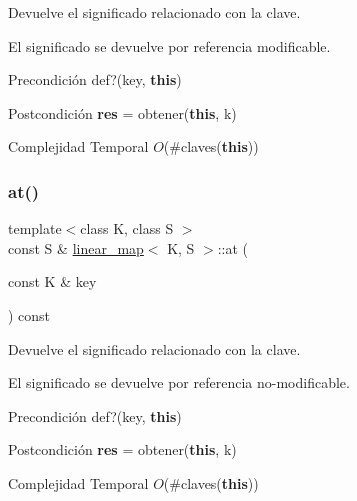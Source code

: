 Devuelve el significado relacionado con la clave. 

El significado se devuelve por referencia modificable.

\begin{DoxyPrecond}{Precondición}
def?(key, {\bfseries this}) 
\end{DoxyPrecond}
\begin{DoxyPostcond}{Postcondición}
{\bfseries res} = obtener({\bfseries this}, k)
\end{DoxyPostcond}

\begin{DoxyDescription}
\item[Complejidad Temporal]$O$(\#claves({\bfseries this}))
\end{DoxyDescription}\mbox{\label{classlinear__map_a373f306f920941123cb47f6b77ed97ed}} 
\subsubsection{\texorpdfstring{at()}{at()}\hspace{0.1cm}{\footnotesize\ttfamily [2/2]}}
{\footnotesize\ttfamily template$<$class K, class S $>$ \\
const S \& \mbox{\hyperlink{classlinear__map}{linear\+\_\+map}}$<$ K, S $>$\+::at (\begin{DoxyParamCaption}\item[{const K \&}]{key }\end{DoxyParamCaption}) const}



Devuelve el significado relacionado con la clave. 

El significado se devuelve por referencia no-\/modificable.

\begin{DoxyPrecond}{Precondición}
def?(key, {\bfseries this}) 
\end{DoxyPrecond}
\begin{DoxyPostcond}{Postcondición}
{\bfseries res} = obtener({\bfseries this}, k)
\end{DoxyPostcond}

\begin{DoxyDescription}
\item[Complejidad Temporal]$O$(\#claves({\bfseries this}))
\end{DoxyDescription}\mbox{\label{classlinear__map_a88a219ae647727d1b7e67c2dbe36d972}} 
